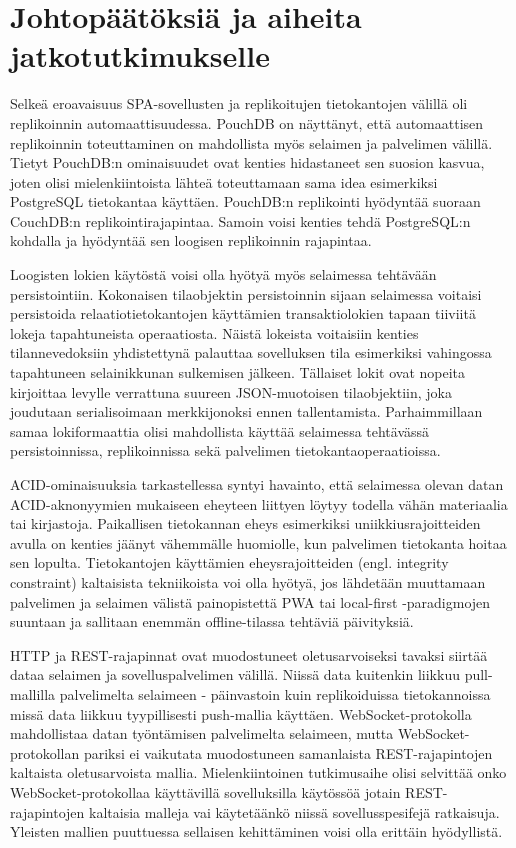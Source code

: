 \documentclass[finnish,twoside,censored,csm,sw-track-2018]{HYthesisML}
\begin{document}
\section{Johtopäätöksiä ja aiheita jatkotutkimukselle}

Selkeä eroavaisuus SPA-sovellusten ja replikoitujen tietokantojen välillä oli replikoinnin automaattisuudessa. PouchDB on näyttänyt, että automaattisen replikoinnin toteuttaminen on mahdollista myös selaimen ja palvelimen välillä. Tietyt PouchDB:n ominaisuudet ovat kenties hidastaneet sen suosion kasvua, joten olisi mielenkiintoista lähteä toteuttamaan sama idea esimerkiksi PostgreSQL tietokantaa käyttäen. PouchDB:n replikointi hyödyntää suoraan CouchDB:n replikointirajapintaa. Samoin voisi kenties tehdä PostgreSQL:n kohdalla ja hyödyntää sen loogisen replikoinnin rajapintaa.

Loogisten lokien käytöstä voisi olla hyötyä myös selaimessa tehtävään persistointiin. Kokonaisen tilaobjektin persistoinnin sijaan selaimessa voitaisi persistoida relaatiotietokantojen käyttämien transaktiolokien tapaan tiiviitä lokeja tapahtuneista operaatiosta. Näistä lokeista voitaisiin kenties tilannevedoksiin yhdistettynä palauttaa sovelluksen tila esimerkiksi vahingossa tapahtuneen selainikkunan sulkemisen jälkeen. Tällaiset lokit ovat nopeita kirjoittaa levylle verrattuna suureen JSON-muotoisen tilaobjektiin, joka joudutaan serialisoimaan merkkijonoksi ennen tallentamista. Parhaimmillaan samaa lokiformaattia olisi mahdollista käyttää selaimessa tehtävässä persistoinnissa, replikoinnissa sekä palvelimen tietokantaoperaatioissa.

ACID-ominaisuuksia tarkastellessa syntyi havainto, että selaimessa olevan datan ACID-aknonyymien mukaiseen eheyteen liittyen löytyy todella vähän materiaalia tai kirjastoja. Paikallisen tietokannan eheys esimerkiksi uniikkiusrajoitteiden avulla on kenties jäänyt vähemmälle huomiolle, kun palvelimen tietokanta hoitaa sen lopulta.  Tietokantojen käyttämien eheysrajoitteiden (engl. integrity constraint) kaltaisista tekniikoista voi olla hyötyä, jos lähdetään muuttamaan palvelimen ja selaimen välistä painopistettä PWA tai local-first -paradigmojen suuntaan ja sallitaan enemmän offline-tilassa tehtäviä päivityksiä.

HTTP ja REST-rajapinnat ovat muodostuneet oletusarvoiseksi tavaksi siirtää dataa selaimen ja sovelluspalvelimen välillä. Niissä data kuitenkin liikkuu pull-mallilla palvelimelta selaimeen - päinvastoin kuin replikoiduissa tietokannoissa missä data liikkuu tyypillisesti push-mallia käyttäen. WebSocket-protokolla mahdollistaa datan työntämisen palvelimelta selaimeen, mutta WebSocket-protokollan pariksi ei vaikutata muodostuneen samanlaista REST-rajapintojen kaltaista oletusarvoista mallia. Mielenkiintoinen tutkimusaihe olisi selvittää onko WebSocket-protokollaa käyttävillä sovelluksilla käytössöä jotain REST-rajapintojen kaltaisia malleja vai käytetäänkö niissä sovellusspesifejä ratkaisuja. Yleisten mallien puuttuessa sellaisen kehittäminen voisi olla erittäin hyödyllistä.
\end{document}
